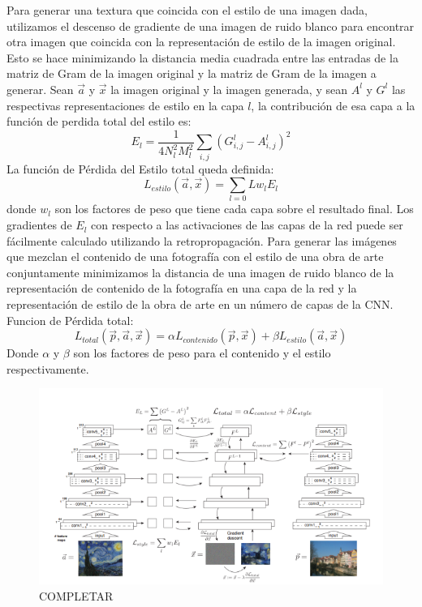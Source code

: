 \documentclass[a4paper,11pt,spanish]{book}
\begin{document}
      Para generar una textura que coincida con el estilo de una imagen dada, utilizamos el descenso de gradiente de una imagen de ruido blanco para encontrar otra imagen que coincida
      con la representación de estilo de la imagen original. Esto se hace minimizando la distancia media cuadrada entre las entradas de la matriz de Gram de la imagen
      original y la matriz de Gram de la imagen a generar. Sean $\overrightarrow{a}$ y $\overrightarrow{x}$ la imagen original y la imagen generada, y sean $A^l$ y $G^l$
      las respectivas representaciones de estilo en la capa $l$, la contribución de esa capa a la función de perdida total del estilo es:
      \begin{equation}
       E_l = \frac{1}{4 N_l^2 M_l^2} \sum_{i,j} (G_{i,j}^l - A_{i,j}^l)^2
      \end{equation}
      La función de Pérdida del Estilo total queda definida:
      \begin{equation}
       L_{estilo}(\overrightarrow{a},\overrightarrow{x}) = \sum_{l=0}{L} w_l E_l
      \end{equation}
      donde $w_l$ son los factores de peso que tiene cada capa sobre el resultado final. Los gradientes de $E_l$ con respecto a las activaciones de las capas de la red puede ser fácilmente
      calculado utilizando la retropropagación.
      Para generar las imágenes que mezclan el contenido de una fotografía con el estilo de una obra de arte conjuntamente minimizamos la distancia de una imagen de ruido blanco
      de la representación de contenido de la fotografía en una capa de la red y la representación de estilo de la obra de arte en un número de capas de la CNN.
      Funcion de Pérdida total:
      \begin{equation}
       L_{total}(\overrightarrow{p},\overrightarrow{a},\overrightarrow{x}) = \alpha L_{contenido}(\overrightarrow{p},\overrightarrow{x}) + \beta L_{estilo}(\overrightarrow{a},\overrightarrow{x})
      \end{equation}
      Donde $\alpha$ y $\beta$ son los factores de peso para el contenido y el estilo respectivamente.

      \begin{figure}[h]
	\includegraphics[width=\linewidth]{./img/gatys_2.png}
	\caption{COMPLETAR}
	\label{fig:gatys_2}
      \end{figure}
\end{document}
